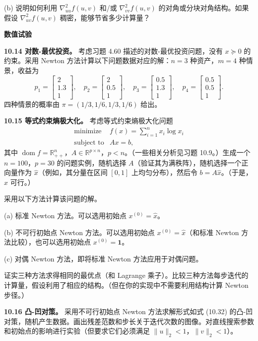 \documentclass[UTF8, 12pt, fontset=fandol, oneside]{ctexart}
\begin{document}
(b) 说明如何利用 $\nabla_{uu}^2f(u,v)$ 和/或 $\nabla_{vv}^2f(u,v)$ 的对角或分块对角结构。如果假设 $\nabla_{uv}^2f(u,v)$ 稠密，能够节省多少计算量？

\noindent\textbf{数值试验}

\noindent\textbf{10.14 对数-最优投资。}\quad
考虑习题 4.60 描述的对数-最优投资问题，没有 $x\succeq0$ 的约束。采用 Newton 方法计算以下问题数据对应的解：$n=3$ 种资产，$m=4$ 种情景，收益为
\[
p_1=
\begin{bmatrix}
2\\
1.3\\
1
\end{bmatrix},
\quad
p_2=
\begin{bmatrix}
2\\
0.5\\
1
\end{bmatrix},
\quad
p_3=
\begin{bmatrix}
0.5\\
1.3\\
1
\end{bmatrix},
\quad
p_4=
\begin{bmatrix}
0.5\\
0.5\\
1
\end{bmatrix}.
\]
四种情景的概率由 $\pi=(1/3,1/6,1/3,1/6)$ 给出。

\noindent\textbf{10.15 等式约束熵极大化。}\quad
考虑等式约束熵极大化问题
\[
\begin{array}{ll}
\mbox{minimize} & f(x)=\displaystyle\sum_{i=1}^n x_i\log x_i\\
\mbox{subject to} & Ax=b,
\end{array}
\]
其中 $\operatorname{dom} f=\mathbb{R}_{++}^n$，$A\in\mathbb{R}^{p\times n}$，$p<n$。（一些相关分析见习题 10.9。）生成一个 $n=100$，$p=30$ 的问题实例，随机选择 $A$（验证其为满秩阵），随机选择一个正向量作为 $\hat{x}$（例如，其分量在区间 $[0,1]$ 上均匀分布），然后令 $b=A\hat{x}$。（于是，$\hat{x}$ 可行。）

采用以下方法计算该问题的解。

(a) 标准 Newton 方法。可以选用初始点 $x^{(0)}=\hat{x}$。

(b) 不可行初始点 Newton 方法。可以选用初始点 $x^{(0)}=\hat{x}$（和标准 Newton 方法比较），也可以选用初始点 $x^{(0)}=\mathbf{1}$。

(c) 对偶 Newton 方法，即将标准 Newton 方法应用于对偶问题。

证实三种方法求得相同的最优点（和 Lagrange 乘子）。比较三种方法每步迭代的计算量，假设利用了相应的结构。（但在你的实现中不需要利用结构计算 Newton 步径。）

\noindent\textbf{10.16 凸-凹对策。}\quad
采用不可行初始点 Newton 方法求解形式如式 (10.32) 的凸-凹对策，随机产生数据。画出残差范数和步长关于迭代次数的图像。对直线搜索参数和初始点的影响进行实验（但要求它们必须满足 $\|u\|_2<1$，$\|v\|_2<1$）。
\end{document}
